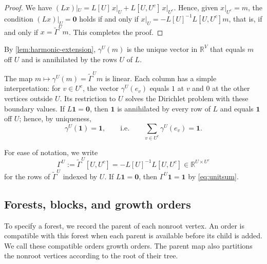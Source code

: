 \documentclass[onefignum,onetabnum]{siamart250211}
\numberwithin{theorem}{section}
\numberwithin{equation}{section}
\newcommand{\R}{\mathbb{R}}
\newcommand{\one}{\mathbf{1}}
\newcommand{\zero}{\mathbf{0}}
\begin{document}
\begin{proof}
We have $(Lx)|_U=L[U]\,x|_U+L[U,U^c]\,x|_{U^c}$. Hence, given
$x|_{U^c}=m$, the condition $(Lx)|_U=\zero$ holds if and only if
$x|_U=-L[U]^{-1}L[U,U^c]m$, that is, if and only if $x=\tilde\Gamma^Um$.
This completes the proof.
\end{proof}




\begin{remark}
By \cref{lem:harmonic-extension}, $\gamma^U(m)$ is the unique vector in
$\R^V$ that equals $m$ off $U$ and is annihilated by the rows $U$ of
$L$.
\end{remark}

The map $m\mapsto\gamma^U(m)=\tilde\Gamma^Um$ is linear. Each column
has a simple interpretation: for $v\in U^c$, the vector
$\gamma^U(e_v)$ equals $1$ at $v$ and $0$ at the other vertices
outside $U$. Its restriction to $U$ solves the Dirichlet problem with
these boundary values. If
$L\one=\zero$, then $\one$ is annihilated by every row of $L$ and equals
$\one$ off $U$; hence, by uniqueness,
\begin{equation}\label{eq:unitsum}
\gamma^{U}(\one)=\one,\qquad\text{i.e.}\qquad
\sum_{v\in U^c}\gamma^{U}(e_v)=\one .
\end{equation}

For ease of notation, we write
\begin{equation}\label{eq:Gamma}
\Gamma^U:=\tilde\Gamma^U[U,U^c]=-L[U]^{-1}L[U,U^c]\in\R^{U\times U^c}
\end{equation}
for the rows of $\tilde\Gamma^U$ indexed by $U$. If $L\one=\zero$, then
$\Gamma^U\one=\one$ by \eqref{eq:unitsum}.

\subsection{Forests, blocks, and growth orders}\label{sec:combdef}

To specify a forest, we record the parent of each nonroot vertex.
An order is compatible with this forest when each parent is available
before its child is added. We call these compatible orders growth
orders. The parent map also partitions the nonroot vertices according
to the root of their tree.
\end{document}
